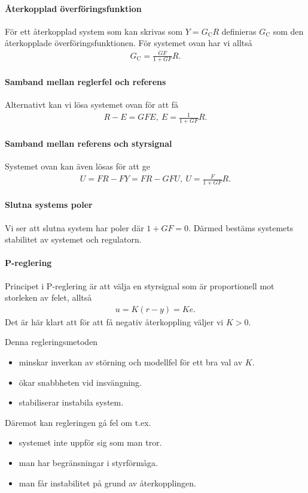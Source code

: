 \paragraph{Återkopplad överföringsfunktion}
För ett återkopplad system som kan skrivas som $Y = G_{\text{C}}R$ definieras $G_{\text{C}}$ som den återkopplade överföringsfunktionen. För systemet ovan har vi alltså
\begin{align*}
	G_{\text{C}} = \frac{GF}{1 + GF}R.
\end{align*}

\paragraph{Samband mellan reglerfel och referens}
Alternativt kan vi lösa systemet ovan för att få
\begin{align*}
	R - E = GFE,\ E = \frac{1}{1 + GF}R.
\end{align*}

\paragraph{Samband mellan referens och styrsignal}
Systemet ovan kan även lösas för att ge
\begin{align*}
	U = FR - FY = FR - GFU,\ U = \frac{F}{1  + GF}R.
\end{align*}

\paragraph{Slutna systems poler}
Vi ser att slutna system har poler där $1 + GF = 0$. Därmed bestäms systemets stabilitet av systemet och regulatorn.

\paragraph{P-reglering}
Principet i P-reglering är att välja en styrsignal som är proportionell mot storleken av felet, alltså
\begin{align*}
	u = K(r - y) = Ke.
\end{align*}
Det är här klart att för att få negativ återkoppling väljer vi $K > 0$.

Denna regleringsmetoden
\begin{itemize}
	\item minskar inverkan av störning och modellfel för ett bra val av $K$.
	\item ökar snabbheten vid insvängning.
	\item stabiliserar instabila system.
\end{itemize}
Däremot kan regleringen gå fel om t.ex.
\begin{itemize}
	\item systemet inte uppför sig som man tror.
	\item man har begränsningar i styrförmåga.
	\item man får instabilitet på grund av återkopplingen.
\end{itemize}

